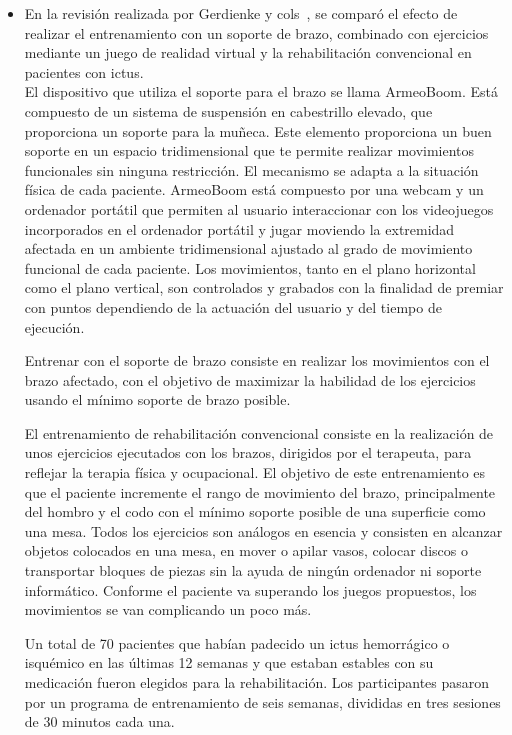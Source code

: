 \begin{itemize}
    \item En la revisión realizada por Gerdienke y cols~\cite{doi:10.1177/1545968314535985}, se comparó el efecto de realizar el entrenamiento con un soporte de brazo, combinado con ejercicios mediante un juego de realidad virtual y la rehabilitación convencional en pacientes con ictus.\\ El dispositivo que utiliza el soporte para el brazo se llama ArmeoBoom. Está compuesto de un sistema de suspensión en cabestrillo elevado, que proporciona un soporte para la muñeca. Este elemento proporciona un buen soporte en un espacio tridimensional que te permite realizar movimientos funcionales sin ninguna restricción. El mecanismo se adapta a la situación física de cada paciente. ArmeoBoom está compuesto por una webcam y un ordenador portátil que permiten al usuario interaccionar con los videojuegos incorporados en el ordenador portátil y jugar moviendo la extremidad afectada en un ambiente tridimensional ajustado al grado de movimiento funcional de cada paciente. Los movimientos, tanto en el plano horizontal como el plano vertical, son controlados y grabados con la finalidad de premiar con puntos dependiendo de la actuación del usuario y del tiempo de ejecución.
    
    Entrenar con el soporte de brazo consiste en realizar los movimientos con el brazo afectado, con el objetivo de maximizar la habilidad de los ejercicios usando el mínimo soporte de brazo posible.
    
    El entrenamiento de rehabilitación convencional consiste en la realización de unos ejercicios ejecutados con los brazos, dirigidos por el terapeuta, para reflejar la terapia física y ocupacional. El objetivo de este entrenamiento es que el paciente incremente el rango de movimiento del brazo, principalmente del hombro y el codo con el mínimo soporte posible de una superficie como una mesa. Todos los ejercicios son análogos en esencia y consisten en alcanzar objetos colocados en una mesa, en mover o apilar vasos, colocar discos o transportar bloques de piezas sin la ayuda de ningún ordenador ni soporte informático. Conforme el paciente va superando los juegos propuestos, los movimientos se van complicando un poco más.

    Un total de 70 pacientes que habían padecido un ictus hemorrágico o isquémico en las últimas 12 semanas y que estaban estables con su medicación fueron elegidos para la rehabilitación. Los participantes pasaron por un programa de entrenamiento de seis semanas, divididas en tres sesiones de 30 minutos cada una.
    

\end{itemize}
